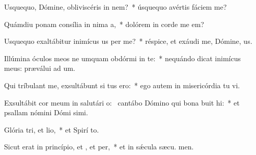 \item Usquequo, Dómine, obliviscéris  in nem?~* úsquequo avértis fáciem   me?
\item Quámdiu ponam consília in nima a,~* dolórem in corde me  em?
\item Usquequo exaltábitur inimícus us per me?~* réspice, et exáudi me, Dómine,  us.
\item Illúmina óculos meos ne umquam obdórmi in te:~* nequándo dicat inimícus meus: præválui ad um.
\item Qui tríbulant me, exsultábunt si tus ero:~* ego autem in misericórdia tu vi.
\item Exsultábit cor meum in salutári o:~\pscross{} cantábo Dómino qui bona buit hi:~* et psallam nómini Dómi simi.
\item Glória tri, et lio,~* et Spirí to.
\item Sicut erat in princípio, et , et per,~* et in sǽcula sæcu. men.
